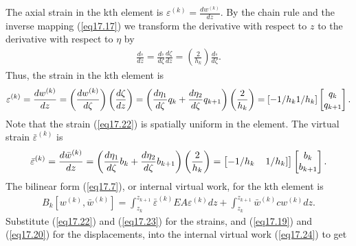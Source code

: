 \documentclass{AeroStructure-ERJohnson}
\begin{document}
The axial strain in the kth element is $\varepsilon^{(k)}=\frac{d w^{(k)}}{d z}$. By the chain rule and the inverse mapping (\ref{eq17.17}) we transform the derivative with respect to $z$ to the derivative with respect to $\eta$ by
\begin{align}\label{eq17.21}
\frac{d \square}{d z}=\frac{d \square}{d \zeta} \frac{d \zeta}{d z}=\left(\frac{2}{h_{k}}\right) \frac{d \square}{d \zeta}.
\end{align}
Thus, the strain in the kth element is
\begin{align}\label{eq17.22}
\varepsilon^{(k)}=\frac{d w^{(k)}}{d z}=\left(\frac{d w^{(k)}}{d \zeta}\right)\left(\frac{d \zeta}{d z}\right)=\left(\frac{d \eta_{1}}{d \zeta} q_{k}+\frac{d \eta_{2}}{d \zeta} q_{k+1}\right)\left(\frac{2}{h_{k}}\right)=\left[-1/h_{k} 1/ h_{k}\right]\left[\begin{array}{@{}c@{}}q_{k} \\q_{k+1}\end{array}\right].
\end{align}
Note that the strain (\ref{eq17.22}) is spatially uniform in the element. The virtual strain $\bar{\varepsilon}^{(k)}$ is
\begin{align}\label{eq17.23}
\bar{\varepsilon}^{(k)}=\frac{d \bar{w}^{(k)}}{d z}=\left(\frac{d \eta_{1}}{d \zeta} b_{k}+\frac{d \eta_{2}}{d \zeta} b_{k+1}\right)\left(\frac{2}{h_{k}}\right)=
\left[\begin{array}{@{}ll@{}}
-1/h_{k} & \left.1/ h_{k}\right]\end{array}\right]\left[\begin{array}{@{}c@{}}
b_{k} \\b_{k+1}\end{array}\right].
\end{align}
The bilinear form (\ref{eq17.7}), or internal virtual work, for the kth element is
\begin{align}\label{eq17.24}
B_{k}[w^{(k)}, \bar{w}^{(k)}]=\int_{z_{k}}^{z_{k+1}} \bar{\varepsilon}^{(k)} E A \varepsilon^{(k)} d z+\int_{z_{k}}^{z_{k+1}} \bar{w}^{(k)} c w^{(k)} d z.
\end{align}
Substitute (\ref{eq17.22}) and (\ref{eq17.23}) for the strains, and (\ref{eq17.19}) and (\ref{eq17.20}) for the displacements, into the internal virtual work (\ref{eq17.24}) to get
\end{document}
